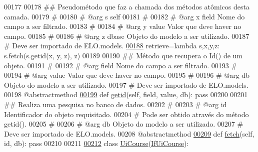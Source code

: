 \begin{DoxyCode}
00177 
00178     \textcolor{comment}{## Pseudométodo que faz a chamada dos métodos atômicos desta camada.}
00179     \textcolor{comment}{#}
00180     \textcolor{comment}{#   @arg    s   self}
00181     \textcolor{comment}{#}
00182     \textcolor{comment}{#   @arg    x   field   Nome do campo a ser filtrado.}
00183     \textcolor{comment}{#}
00184     \textcolor{comment}{#   @arg    y   value   Valor que deve haver no campo.}
00185     \textcolor{comment}{#}
00186     \textcolor{comment}{#   @arg    z   dbase   Objeto do modelo a ser utilizado.}
00187     \textcolor{comment}{#                           Deve ser importado de ELO.models.}
\hypertarget{CourseUnit_8py_source_l00188}{}\hyperlink{classCourse_1_1CourseUnit_1_1IfPersCourse_ae7dca869bdb9f9db07ce55bf78991aae}{00188}     retrieve=\textcolor{keyword}{lambda} s,x,y,z: s.fetch(s.getid(x, y, z), z)
00189 
00190     \textcolor{comment}{## Método que recupera o Id() de um objeto.}
00191     \textcolor{comment}{#}
00192     \textcolor{comment}{#   @arg field  Nome do campo a ser filtrado.}
00193     \textcolor{comment}{#}
00194     \textcolor{comment}{#   @arg value  Valor que deve haver no campo.}
00195     \textcolor{comment}{#}
00196     \textcolor{comment}{#   @arg db     Objeto do modelo a ser utilizado.}
00197     \textcolor{comment}{#                   Deve ser importado de ELO.models.}
00198     @abstractmethod
\hypertarget{CourseUnit_8py_source_l00199}{}\hyperlink{classCourse_1_1CourseUnit_1_1IfPersCourse_ad7318280b436d4c91b00a14e865317ee}{00199}     \textcolor{keyword}{def }\hyperlink{classCourse_1_1CourseUnit_1_1IfPersCourse_ad7318280b436d4c91b00a14e865317ee}{getid}(self, field, value, db): \textcolor{keyword}{pass}
00200 
00201     \textcolor{comment}{## Realiza uma pesquisa no banco de dados.}
00202     \textcolor{comment}{#}
00203     \textcolor{comment}{#   @arg id     Identificador do objeto requisitado.}
00204     \textcolor{comment}{#                   Pode ser obtido através do método getid().}
00205     \textcolor{comment}{#   }
00206     \textcolor{comment}{#   @arg db     Objeto do modelo a ser utilizado.}
00207     \textcolor{comment}{#                   Deve ser importado de ELO.models.}
00208     @abstractmethod
\hypertarget{CourseUnit_8py_source_l00209}{}\hyperlink{classCourse_1_1CourseUnit_1_1IfPersCourse_a41c931a6cdf9184ca2aa3cfde7cd706a}{00209}     \textcolor{keyword}{def }\hyperlink{classCourse_1_1CourseUnit_1_1IfPersCourse_a41c931a6cdf9184ca2aa3cfde7cd706a}{fetch}(self, id, db): \textcolor{keyword}{pass}
00210 
00211 
\hypertarget{CourseUnit_8py_source_l00212}{}\hyperlink{classCourse_1_1CourseUnit_1_1UiCourse}{00212} \textcolor{keyword}{class }\hyperlink{classCourse_1_1CourseUnit_1_1UiCourse}{UiCourse}(\hyperlink{classCourse_1_1CourseUnit_1_1IfUiCourse}{IfUiCourse}):

\end{DoxyCode}

